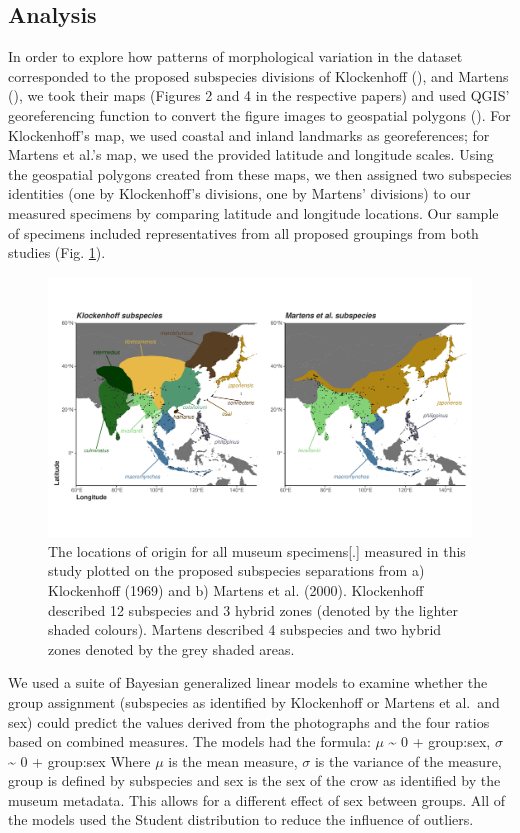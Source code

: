 \documentclass[10pt,a4paper]{article}
\begin{document}
\subsection{Analysis}\label{analysis}

In order to explore how patterns of morphological variation in the dataset corresponded to the proposed subspecies divisions of Klockenhoff (), and Martens (), we took their maps (Figures 2 and 4 in the respective papers) and used QGIS' georeferencing function to convert the figure images to geospatial polygons ().
For Klockenhoff's map, we used coastal and inland landmarks as georeferences; for Martens et al.'s map, we used the provided latitude and longitude scales.
Using the geospatial polygons created from these maps, we then assigned two subspecies identities (one by Klockenhoff's divisions, one by Martens' divisions) to our measured specimens by comparing latitude and longitude locations.
Our sample of specimens included representatives from all proposed groupings from both studies (Fig. \ref{fig:subspeciesPlots}).

\begin{figure}
\includegraphics[width=0.9\linewidth]{../Figures/combined Subspecies Plot} \caption{The locations of origin for all museum specimens[.] measured in this study plotted on the proposed subspecies separations from a) Klockenhoff (1969) and b) Martens et al. (2000). Klockenhoff described 12 subspecies and 3 hybrid zones (denoted by the lighter shaded colours). Martens described 4 subspecies and two hybrid zones denoted by the grey shaded areas.}\label{fig:subspeciesPlots}
\end{figure}

We used a suite of Bayesian generalized linear models to examine whether the group assignment (subspecies as identified by Klockenhoff or Martens et al.~and sex) could predict the values derived from the photographs and the four ratios based on combined measures.
The models had the formula: \(\mu\) \textasciitilde{} 0 + group:sex, \(\sigma\) \textasciitilde{} 0 + group:sex
Where \(\mu\) is the mean measure, \(\sigma\) is the variance of the measure, group is defined by subspecies and sex is the sex of the crow as identified by the museum metadata.
This allows for a different effect of sex between groups.
All of the models used the Student distribution to reduce the influence of outliers.
\end{document}
